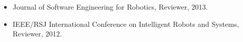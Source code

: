 \begin{itemize}[leftmargin=*]
  \item Journal of Software Engineering for Robotics, Reviewer, 2013.
  \item IEEE/RSJ International Conference on Intelligent Robots and
        Systems, Reviewer, 2012.
\end{itemize}
